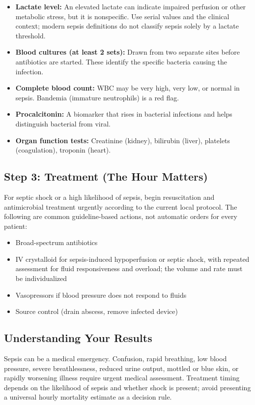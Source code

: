 \begin{itemize}
    \item \textbf{Lactate level:} An elevated lactate can indicate impaired perfusion or other metabolic stress, but it is nonspecific. Use serial values and the clinical context; modern sepsis definitions do not classify sepsis solely by a lactate threshold.
    \item \textbf{Blood cultures (at least 2 sets):} Drawn from two separate sites before antibiotics are started. These identify the specific bacteria causing the infection.
    \item \textbf{Complete blood count:} WBC may be very high, very low, or normal in sepsis. Bandemia (immature neutrophils) is a red flag.
    \item \textbf{Procalcitonin:} A biomarker that rises in bacterial infections and helps distinguish bacterial from viral.
    \item \textbf{Organ function tests:} Creatinine (kidney), bilirubin (liver), platelets (coagulation), troponin (heart).
\end{itemize}

\subsection{Step 3: Treatment (The Hour Matters)}

For septic shock or a high likelihood of sepsis, begin resuscitation and antimicrobial treatment urgently according to the current local protocol. The following are common guideline-based actions, not automatic orders for every patient:
\begin{itemize}
    \item Broad-spectrum antibiotics
    \item IV crystalloid for sepsis-induced hypoperfusion or septic shock, with repeated assessment for fluid responsiveness and overload; the volume and rate must be individualized
    \item Vasopressors if blood pressure does not respond to fluids
    \item Source control (drain abscess, remove infected device)
\end{itemize}

\subsection{Understanding Your Results}

Sepsis can be a medical emergency. Confusion, rapid breathing, low blood pressure, severe breathlessness, reduced urine output, mottled or blue skin, or rapidly worsening illness require urgent medical assessment. Treatment timing depends on the likelihood of sepsis and whether shock is present; avoid presenting a universal hourly mortality estimate as a decision rule.

